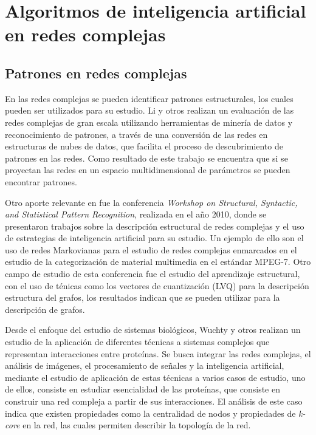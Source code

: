 \section{Algoritmos de inteligencia artificial en redes complejas}


\subsection{Patrones en redes complejas}

En las redes complejas se pueden identificar patrones estructurales, los cuales pueden ser
utilizados para su estudio. Li y otros\cite{Li2012IA} realizan un evaluación de las redes complejas de gran escala utilizando herramientas de minería de datos y reconocimiento de patrones, a través de una conversión de las redes en estructuras de nubes de datos, que facilita el proceso de descubrimiento de patrones en las redes. Como resultado de este trabajo se encuentra que si se proyectan las redes en un espacio multidimensional de parámetros se pueden encontrar patrones.

Otro aporte relevante en fue la conferencia \textit{Workshop on Structural, Syntactic, and Statistical Pattern Recognition}\cite{Jain2000}, realizada
en el año 2010, donde se presentaron trabajos sobre la descripción estructural de redes complejas y el uso de estrategias de inteligencia artificial para su estudio. Un ejemplo de ello son el uso de redes Markovianas para el estudio de redes complejas enmarcados en el estudio de la categorización de material multimedia en el estándar MPEG-7. Otro campo de estudio de esta conferencia fue el estudio del aprendizaje estructural, con el uso de ténicas como los vectores de cuantización (LVQ) para la descripción estructura del grafos, los resultados indican que se
pueden utilizar para la descripción de grafos.


Desde el enfoque del estudio de sistemas biológicos, Wuchty y otros\cite{Wuchty2005} realizan un estudio de la aplicación de diferentes técnicas a sistemas complejos que representan interacciones entre proteínas. Se busca integrar las redes complejas, el análisis de imágenes, el procesamiento de señales y la inteligencia artificial, mediante el estudio de aplicación de estas técnicas a varios casos de estudio, uno de ellos, consiste en estudiar esencialidad de las proteínas, que consiste en construir una red compleja a partir de sus interacciones. El análisis de este caso indica que existen propiedades como
la centralidad de nodos y propiedades de \textit{k-core} en la red, las cuales permiten describir la topología de la red.

